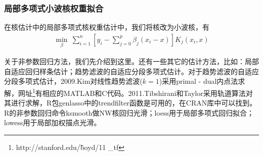         \subsubsection{局部多项式小波核权重拟合}
            \par
            在核估计中的局部多项式核权重估计中，我们将核改为小波核，有
            \begin{align*}
            \min_\beta \ \sum_{i=1}^n\left[y_i - \sum_{j=0}^p\beta_j(x_i - x)\right] K_j(x_i,x)
            \end{align*}
            \par
            关于非参数回归方法，我们先介绍到这里。还有一些其它的估计方法，比如：局部自适应回归样条估计；趋势滤波的自适应分段多项式估计。对于趋势滤波的自适应分段多项式估计，2009.Kim对线性趋势滤波($k=1$)采用primal - dual内点法求解，网址\footnote{http://stanford.edu/\~boyd/11
            \_tf}有相应的MATLAB和C代码。2011.Tibshirani和Taylor采用轨道算法对其进行求解，R包genlasso中的trendfilter函数是可用的，在CRAN库中可以找到。R的非参数回归命令ksmooth做NW核回归光滑；loess用于局部多项式回归拟合；lowess用于局部加权描点光滑。




